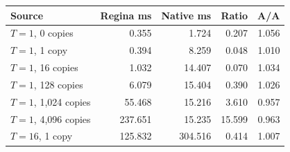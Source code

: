 \begin{center}
\small
\begin{tabular}{@{}lrrrr@{}}
\toprule
Source & Regina ms & Native ms & Ratio & A/A \\
\midrule
$T=1$, 0 copies & 0.355 & 1.724 & 0.207 & 1.056 \\
$T=1$, 1 copy & 0.394 & 8.259 & 0.048 & 1.010 \\
$T=1$, 16 copies & 1.032 & 14.407 & 0.070 & 1.034 \\
$T=1$, 128 copies & 6.079 & 15.404 & 0.390 & 1.026 \\
$T=1$, 1,024 copies & 55.468 & 15.216 & 3.610 & 0.957 \\
$T=1$, 4,096 copies & 237.651 & 15.235 & 15.599 & 0.963 \\
$T=16$, 1 copy & 125.832 & 304.516 & 0.414 & 1.007 \\
\bottomrule
\end{tabular}
\end{center}
